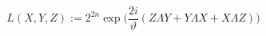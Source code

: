 \begin{equation}
	L(X,Y,Z):=2^{2n}\exp\Big(\frac{2i}{\vartheta}(Z\Lambda Y+Y\Lambda X+X\Lambda Z)\Big)
\end{equation}

